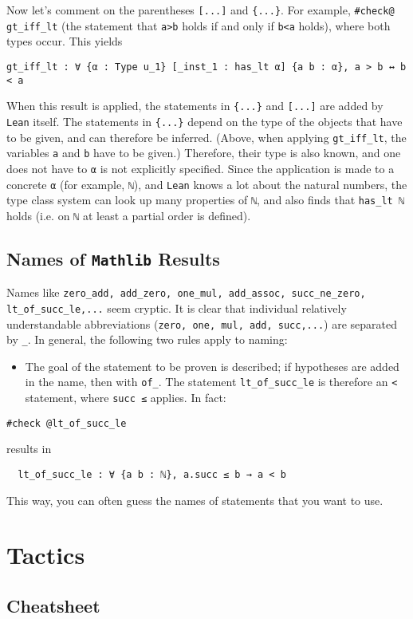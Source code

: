 \documentclass{memoir}
\begin{document}
Now let's comment on the parentheses \Verb|[...]| and \Verb|{...}|. For example, \Verb|#check@ gt_iff_lt| (the statement that \Verb|a>b| holds if and only if \Verb|b<a| holds), where both types occur. This yields

\begin{verbatim}
gt_iff_lt : ∀ {α : Type u_1} [_inst_1 : has_lt α] {a b : α}, a > b ↔ b < a

\end{verbatim}


When this result is applied, the statements in \Verb|{...}| and \Verb|[...]| are added by \Verb|Lean| itself. The statements in \Verb|{...}| depend on the type of the objects that have to be given, and can therefore be inferred. (Above, when applying \Verb|gt_iff_lt|, the variables \Verb|a| and \Verb|b| have to be given.) Therefore, their type is also known, and one does not have to \Verb|α| is not explicitly specified. Since the application is made to a concrete \Verb|α| (for example, \Verb|ℕ|), and \Verb|Lean| knows a lot about the natural numbers, the type class system can look up many properties of \Verb|ℕ|, and also finds that \Verb|has_lt ℕ| holds (i.e. on \Verb|ℕ| at least a partial order is defined).



\section{Names of \Verb|Mathlib| Results}

Names like \Verb|zero_add, add_zero, one_mul, add_assoc, succ_ne_zero, lt_of_succ_le,...| seem cryptic. It is clear that individual relatively understandable abbreviations (\Verb|zero, one, mul, add, succ,...|) are separated by \Verb|_|. In general, the following two rules apply to naming:

\begin{itemize}
\item The goal of the statement to be proven is described; if hypotheses are added in the name, then with \Verb|of_|. The statement \Verb|lt_of_succ_le| is therefore an \Verb|<| statement, where \Verb|succ ≤| applies. In fact:
\end{itemize}


\begin{verbatim}
#check @lt_of_succ_le

\end{verbatim}


results in

\begin{verbatim}
  lt_of_succ_le : ∀ {a b : ℕ}, a.succ ≤ b → a < b

\end{verbatim}


This way, you can often guess the names of statements that you want to use.




\chapter{Tactics}



\section{Cheatsheet}
\end{document}
